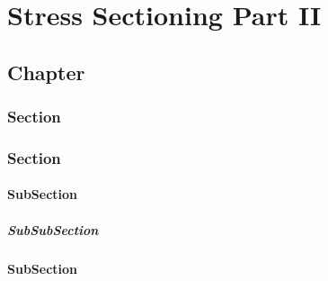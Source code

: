 %

%
%
%
%

\part{Stress Sectioning Part II}

\chapter{Chapter}

\section{Section}
\section{Section}

\subsection{SubSection}
\subsubsection{SubSubSection}



\subsection{SubSection}
